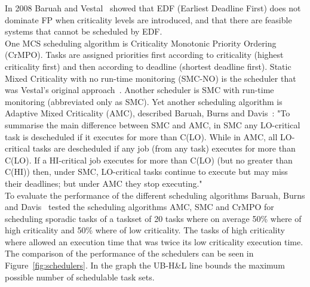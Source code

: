 In 2008 Baruah and Vestal~\cite{baruah2008} showed that EDF (Earliest Deadline First) does not dominate FP when criticality levels are introduced, and that there are feasible systems that cannot be scheduled by EDF.\\

One MCS scheduling algorithm is Criticality Monotonic Priority Ordering (CrMPO). Tasks are assigned priorities first according to criticality (highest criticality first) and then according to deadline (shortest deadline first). Static Mixed Criticality with no run-time monitoring (SMC-NO) is the scheduler that was Vestal's original approach~\cite{vestal2007}. Another scheduler is SMC with run-time monitoring (abbreviated only as SMC). Yet another scheduling algorithm is Adaptive Mixed Criticality (AMC), described Baruah, Burns and Davis~\cite{baruah2011}: "To summarise the main difference between SMC and AMC, in SMC any LO-critical task is descheduled if it executes for more than C(LO). While in AMC, all LO-critical tasks are descheduled if any job (from any task) executes for more than C(LO). If a HI-critical job executes for more than C(LO) (but no greater than C(HI)) then, under SMC, LO-critical tasks continue to execute but may miss their deadlines; but under AMC they stop executing."\\

To evaluate the performance of the different scheduling algorithms Baruah, Burns and Davis~\cite{baruah2011} tested the scheduling algorithms AMC, SMC and CrMPO for scheduling sporadic tasks of a taskset of 20 tasks where on average 50\% where of high criticality and 50\% where of low criticality. The tasks of high criticality where allowed an execution time that was twice its low criticality execution time. The comparison of the performance of the schedulers can be seen in Figure~\ref{fig:schedulers}. In the graph the UB-H\&L line bounds the maximum possible number of schedulable task sets.


